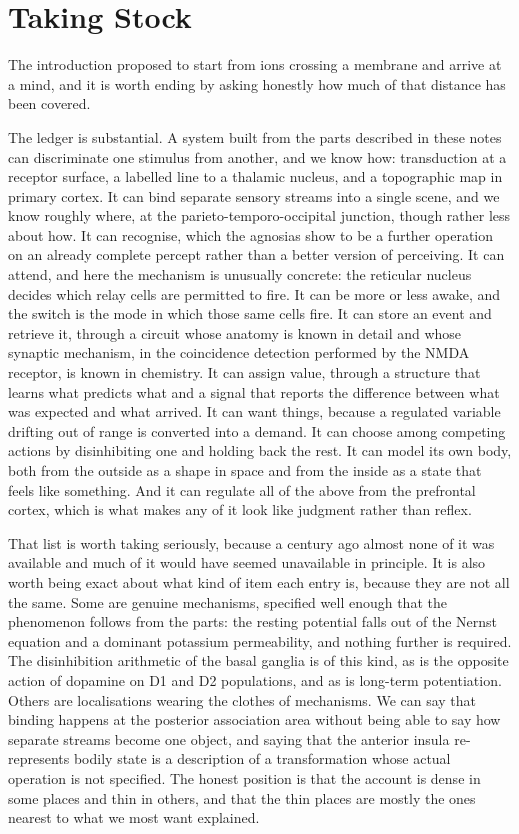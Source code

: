 \documentclass[11pt]{article}
\begin{document}
\section*{Taking Stock}

The introduction proposed to start from ions crossing a membrane and arrive at a mind, and it is worth ending by asking honestly how much of that distance has been covered.

The ledger is substantial. A system built from the parts described in these notes can discriminate one stimulus from another, and we know how: transduction at a receptor surface, a labelled line to a thalamic nucleus, and a topographic map in primary cortex. It can bind separate sensory streams into a single scene, and we know roughly where, at the parieto-temporo-occipital junction, though rather less about how. It can recognise, which the agnosias show to be a further operation on an already complete percept rather than a better version of perceiving. It can attend, and here the mechanism is unusually concrete: the reticular nucleus decides which relay cells are permitted to fire. It can be more or less awake, and the switch is the mode in which those same cells fire. It can store an event and retrieve it, through a circuit whose anatomy is known in detail and whose synaptic mechanism, in the coincidence detection performed by the NMDA receptor, is known in chemistry. It can assign value, through a structure that learns what predicts what and a signal that reports the difference between what was expected and what arrived. It can want things, because a regulated variable drifting out of range is converted into a demand. It can choose among competing actions by disinhibiting one and holding back the rest. It can model its own body, both from the outside as a shape in space and from the inside as a state that feels like something. And it can regulate all of the above from the prefrontal cortex, which is what makes any of it look like judgment rather than reflex.

That list is worth taking seriously, because a century ago almost none of it was available and much of it would have seemed unavailable in principle. It is also worth being exact about what kind of item each entry is, because they are not all the same. Some are genuine mechanisms, specified well enough that the phenomenon follows from the parts: the resting potential falls out of the Nernst equation and a dominant potassium permeability, and nothing further is required. The disinhibition arithmetic of the basal ganglia is of this kind, as is the opposite action of dopamine on D1 and D2 populations, and as is long-term potentiation. Others are localisations wearing the clothes of mechanisms. We can say that binding happens at the posterior association area without being able to say how separate streams become one object, and saying that the anterior insula re-represents bodily state is a description of a transformation whose actual operation is not specified. The honest position is that the account is dense in some places and thin in others, and that the thin places are mostly the ones nearest to what we most want explained.
\end{document}
